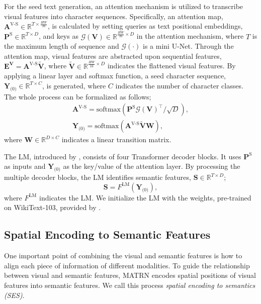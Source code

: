 \documentclass[runningheads]{llncs}
\begin{document}
For the seed text generation, an attention mechanism is utilized to transcribe visual features into character sequences. Specifically, an attention map, $\mathbf{A}^{\text{V-S}} \in \mathbb{R}^{T \times \frac{HW}{16}}$, is calculated by setting queries as text positional embeddings, $\mathbf{P}^{\text{S}}\in \mathbb{R}^{T \times D}$, and keys as $\mathcal{G}(\mathbf{V})\in\mathbb{R}^{\frac{HW}{16} \times D}$ in the attention mechanism, where $T$ is the maximum length of sequence and $\mathcal{G}(\cdot)$ is a mini U-Net. Through the attention map, visual features are abstracted upon sequential features, $\mathbf{E}^{\mathbf{V}} =  \mathbf{A}^{\text{V-S}} \widetilde{\mathbf{V}}$, where $\widetilde{\mathbf{V}} \in\mathbb{R}^{\frac{HW}{16} \times D}$ indicates the flattened visual features. By applying a linear layer and softmax function, a seed character sequence, $\mathbf{Y}_{\text{(0)}}\in\mathbb{R}^{T \times C}$, is generated, where $C$ indicates the number of character classes. The whole process can be formalized as follows;
\begin{gather}
 \mathbf{A}^{\text{V-S}} =  \text{softmax}\left(\mathbf{P}^\text{S}\mathcal{G}(\mathbf{V})^{\top}/\sqrt{D}\right), \label{eq:Att} \\
\mathbf{Y}_{\text{(0)}} = \text{softmax}\left(\mathbf{A}^{\text{V-S}}\widetilde{\mathbf{V}}\mathbf{W}\right), \label{eq:V_Y}
\end{gather}
where $\mathbf{W}\in\mathbb{R}^{D \times C}$ indicates a linear transition matrix.

The LM, introduced by \cite{ABINet}, consists of four Transformer decoder blocks. 
It uses $\mathbf{P}^{\text{S}}$ as inputs and $\mathbf{Y}_{\text{(0)}}$ as the key/value of the attention layer. By processing the multiple decoder blocks, the LM identifies semantic features, $\mathbf{S} \in \mathbb{R}^{T \times D}$;
\begin{equation}
    \mathbf{S} = F^{\text{LM}}(\mathbf{Y}_{\text{(0)}}),
\end{equation}
where $F^{\text{LM}}$ indicates the LM. We initialize the LM with the weights, pre-trained on WikiText-103, provided by \cite{ABINet}.

\subsection{Spatial Encoding to Semantic Features}

One important point of combining the visual and semantic features is how to align each piece of information of different modalities. To guide the relationship between visual and semantic features, MATRN encodes spatial positions of visual features into semantic features. We call this process \emph{spatial encoding to semantics (SES)}. 
\end{document}
